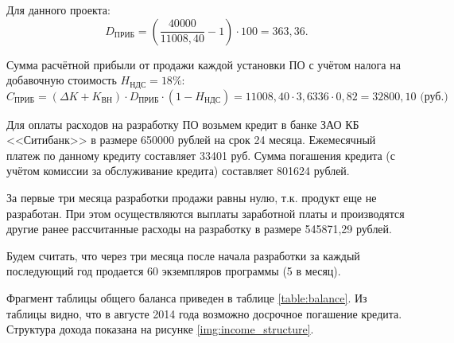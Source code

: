 \vspace{\baselineskip}
Для данного проекта:
\begin{equation}
  \label{eq:profit_calc}
D_\textrm{ПРИБ} = (\frac {40 000} {11 008,40} - 1) \cdot 100 = 363,36.
\end{equation}

Сумма расчётной прибыли от продажи каждой установки ПО с учётом налога на добавочную стоимость $H_\textrm{НДС} = 18\%$:
\begin{equation}
  \label{eq:clear_profit}
C_\textrm{ПРИБ} = (\Delta K + K_\textrm{ВН}) \cdot D_\textrm{ПРИБ} \cdot (1 - H_\textrm{НДС}) = 11008,40 \cdot 3,6336 \cdot 0,82 = 32800,10 \textrm{ (руб.)}
\end{equation}

Для оплаты расходов на разработку ПО возьмем кредит в банке ЗАО КБ <<Ситибанк>> в размере 650000 рублей на срок 24 месяца. Ежемесячный платеж по данному кредиту составляет 33401 руб. Сумма погашения кредита (с учётом комиссии за обслуживание кредита) составляет 801624 рублей.

За первые три месяца разработки продажи равны нулю, т.к. продукт еще не разработан. При этом осуществляются выплаты заработной платы и производятся другие ранее рассчитанные расходы на разработку в размере 545871,29 рублей.

Будем считать, что через три месяца после начала разработки за каждый последующий год продается 60 экземпляров программы (5 в месяц).

Фрагмент таблицы общего баланса приведен в таблице \ref{table:balance}. Из таблицы видно, что в августе 2014 года возможно досрочное погашение кредита. Структура дохода показана на рисунке \ref{img:income_structure}.

